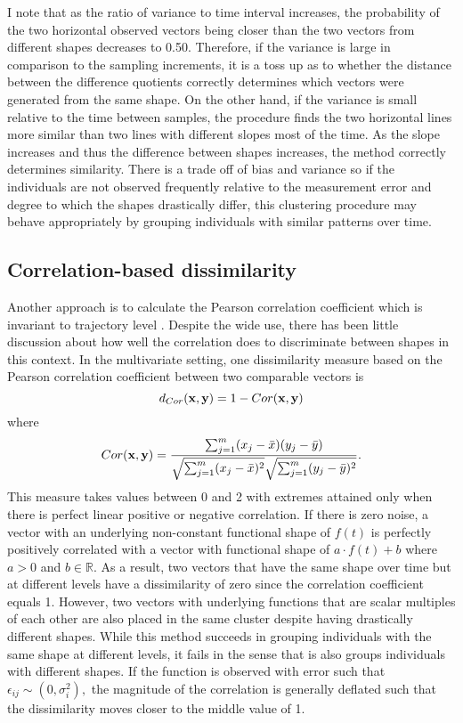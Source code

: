 I note that as the ratio of variance to time interval increases, the probability of the two horizontal observed vectors being closer than the two vectors from different shapes decreases to 0.50. Therefore, if the variance is large in comparison to the sampling increments, it is a toss up as to whether the distance between the difference quotients correctly determines which vectors were generated from the same shape. On the other hand, if the variance is small relative to the time between samples, the procedure finds the two horizontal lines more similar than two lines with different slopes most of the time. As the slope increases and thus the difference between shapes increases, the method correctly determines similarity. There is a trade off of bias and variance so if the individuals are not observed frequently relative to the measurement error and degree to which the shapes drastically differ, this clustering procedure may behave appropriately by grouping individuals with similar patterns over time. 

\subsection{Correlation-based dissimilarity}
Another approach is to calculate the Pearson correlation coefficient which is invariant to trajectory level \cite{chouakria2007, eisen1998, chiou2008}. Despite the wide use, there has been little discussion about how well the correlation does to discriminate between shapes in this context. In the multivariate setting, one dissimilarity measure based on the Pearson correlation coefficient between two comparable vectors is 
$$d_{Cor}(\mathbf x,\mathbf y) = 1-Cor(\mathbf x,\mathbf y)$$ 
where $$Cor(\mathbf x,\mathbf y) = \frac{\sum^{m}_{j=1}(x_{j}-\bar{x})(y_{j}-\bar{y})}{\sqrt{\sum^{m}_{j=1}(x_{j}-\bar{x})^{2}}\sqrt{\sum^{m}_{j=1}(y_{j}-\bar{y})^{2}}}.$$
This measure takes values between 0 and 2 with extremes attained only when there is perfect linear positive or negative correlation. If there is zero noise, a vector with an underlying non-constant functional shape of $f(t)$ is perfectly positively correlated with a vector with functional shape of $a\cdot f(t) + b$ where $a>0$ and $b\in\mathbb{R}$. As a result, two vectors that have the same shape over time but at different levels have a dissimilarity of zero since the correlation coefficient equals 1. However, two vectors with underlying functions that are scalar multiples of each other are also placed in the same cluster despite having drastically different shapes. While this method succeeds in grouping individuals with the same shape at different levels, it fails in the sense that is also groups individuals with different shapes. If the function is observed with error such that $\epsilon_{ij}\sim(0,\sigma_{i}^{2}),$ the magnitude of the correlation is generally deflated such that the dissimilarity moves closer to the middle value of 1.

